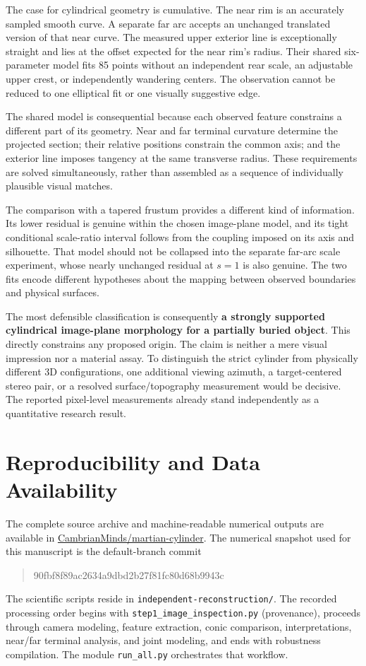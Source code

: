 \documentclass[11pt,letterpaper]{article}
\newcommand{\sourcepath}[1]{\nolinkurl{#1}}
\newcommand{\repo}{\href{https://github.com/CambrianMinds/martian-cylinder}{CambrianMinds/martian-cylinder}}
\begin{document}
The case for cylindrical geometry is cumulative. The near rim is an accurately sampled smooth curve. A separate far arc accepts an unchanged translated version of that near curve. The measured upper exterior line is exceptionally straight and lies at the offset expected for the near rim's radius. Their shared six-parameter model fits 85 points without an independent rear scale, an adjustable upper crest, or independently wandering centers. The observation cannot be reduced to one elliptical fit or one visually suggestive edge.

The shared model is consequential because each observed feature constrains a different part of its geometry. Near and far terminal curvature determine the projected section; their relative positions constrain the common axis; and the exterior line imposes tangency at the same transverse radius. These requirements are solved simultaneously, rather than assembled as a sequence of individually plausible visual matches.

The comparison with a tapered frustum provides a different kind of information. Its lower residual is genuine within the chosen image-plane model, and its tight conditional scale-ratio interval follows from the coupling imposed on its axis and silhouette. That model should not be collapsed into the separate far-arc scale experiment, whose nearly unchanged residual at \(s=1\) is also genuine. The two fits encode different hypotheses about the mapping between observed boundaries and physical surfaces.

The most defensible classification is consequently \textbf{a strongly supported cylindrical image-plane morphology for a partially buried object}. This directly constrains any proposed origin. The claim is neither a mere visual impression nor a material assay. To distinguish the strict cylinder from physically different 3D configurations, one additional viewing azimuth, a target-centered stereo pair, or a resolved surface/topography measurement would be decisive. The reported pixel-level measurements already stand independently as a quantitative research result.

\section{Reproducibility and Data Availability}
\label{sec:reproduce}

The complete source archive and machine-readable numerical outputs are available in \repo. The numerical snapshot used for this manuscript is the default-branch commit
\begin{quote}\small\ttfamily\color{ink}
90fbf8f89ac2634a9dbd2b27f81fc80d68b9943c
\end{quote}
The scientific scripts reside in \sourcepath{independent-reconstruction/}. The recorded processing order begins with \sourcepath{step1_image_inspection.py} (provenance), proceeds through camera modeling, feature extraction, conic comparison, interpretations, near/far terminal analysis, and joint modeling, and ends with robustness compilation. The module \sourcepath{run_all.py} orchestrates that workflow.
\end{document}
